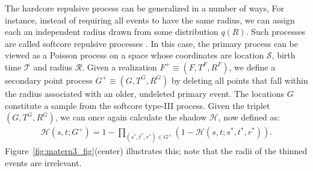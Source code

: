 \documentclass{statsoc}
\begin{document}
The hardcore repulsive process can be generalized in a number of ways, %
For instance, instead of requiring all 
\matern events to have the same radius, we can assign each an independent radius drawn from 
some distribution $q(R)$. Such \matern processes are called softcore repulsive processes \citep{Hube:Wolp:2009}. In this case, the primary process
can be viewed as a Poisson process on a space whose coordinates are location $\mathcal{S}$, birth time $\mathcal{T}$ and radius
$\mathcal{R}$. Given a realization $F^+ \equiv (F, T^F, R^F)$, we define a secondary point process $G^+ \equiv (G, T^G, R^G)$ by deleting 
all points that fall within the radius associated with an older, undeleted primary event.  The locations $G$ constitute a sample from the 
softcore \matern type-III process. %
Given the triplet $(G, T^G, R^G)$, we can once again calculate the shadow $\mathscr{H}$, now defined as: 
\begin{align}
  \mathscr{H}(s,t;G^+) = 1 - \!\!\!\!\!\!\!\!\!\!\! \prod_{(s^*,t^*, r^*) \in G^+} \!\!\!\!\!\!\!\!\!\! \left( 1 - \mathscr{H}(s,t;s^*,t^*, r^*) \right).
\end{align}
Figure~\ref{fig:matern3_fig}(center) illustrates this; note that the radii of the thinned events are irrelevant. 
\end{document}
